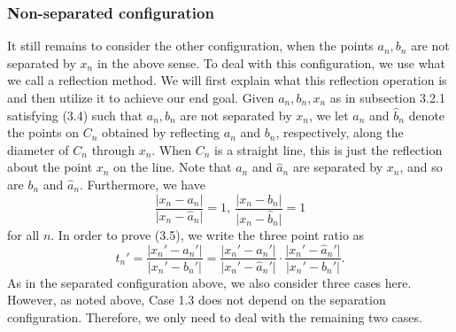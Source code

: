 \documentclass[11pt]{amsart}
\numberwithin{equation}{section}
\theoremstyle{plain}
\theoremstyle{step}
\newcommand{\abs}[1]{\lvert#1\rvert}
\newcommand{\anr}{\hat{a}_n}
\newcommand{\bnr}{\hat{b}_n}
\begin{document}
\subsubsection{Non-separated configuration}
It still remains to consider the other configuration, when the points $a_n,b_n$ are not separated by $x_n$ in the above sense. To deal with this configuration, we use what we call a reflection method. We will first explain what this reflection operation is and then utilize it to achieve our end goal. Given  $a_n,b_n,x_n$ as in subsection 3.2.1 satisfying (3.4) such that $a_n,b_n$ are not separated by $x_n$, we let $\anr$ and $\bnr$ denote the points on $C_n$ obtained by reflecting $a_n$ and $b_n$, respectively, along the diameter of $C_n$ through $x_n$. When $C_n$ is a straight line, this is just the reflection about the point $x_n$ on the line. Note that $a_n$ and $\anr$ are separated by $x_n$, and so are $b_n$ and $\anr$. Furthermore, we have
\begin{equation}
\frac{\abs{x_n-a_n}}{\abs{x_n-\anr}}=1, \ \frac{\abs{x_n-b_n}}{\abs{x_n-\bnr}}=1
\end{equation}
for all $n$. In order to prove (3.5), we write the three point ratio as
\begin{equation}t_n'=\frac{\abs{x_n'-a_n'}}{\abs{x_n'-b_n'}}=\frac{\abs{x_n'-a_n'}}{\abs{x_n'-\anr'}}\cdot \frac{\abs{x_n'-\anr'}}{\abs{x_n'-b_n'}}. 
\end{equation}
As in the separated configuration above, we also consider three cases here. However, as noted above, Case 1.3 does not depend on the separation configuration. Therefore, we only need to deal with the remaining two cases.
\end{document}
